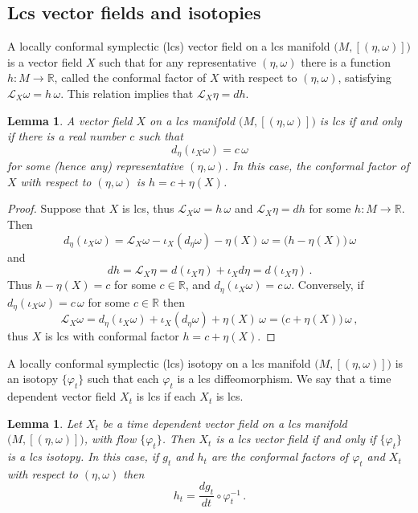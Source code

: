 \documentclass{amsart}
\newtheorem{lemma}[thm]{Lemma}
\theoremstyle{remark}
\begin{document}
\subsection{Lcs vector fields and isotopies}

A locally conformal symplectic (lcs) vector field
on a lcs manifold $\big(M, [(\eta, \omega)]\big)$
is a vector field $X$ such that for any representative $(\eta, \omega)$
there is a function $h: M \rightarrow \mathbb{R}$,
called the conformal factor of $X$ with respect to $(\eta, \omega)$,
satisfying $\mathcal{L}_X \omega = h \, \omega$.
This relation implies that
$\mathcal{L}_X \eta = dh$.

\begin{lemma}\label{lemma: conformal vector field 1}
A vector field $X$ on a lcs manifold $\big(M, [(\eta, \omega)]\big)$
is lcs if and only if there is a real number $c$
such that
$$
d_{\eta} (\iota_X\omega) = c \, \omega
$$
for some (hence any) representative $(\eta, \omega)$.
In this case,
the conformal factor of $X$ with respect to $(\eta, \omega)$
is $h = c + \eta(X)$.
\end{lemma}

\begin{proof}
Suppose that $X$ is lcs,
thus $\mathcal{L}_X \omega = h \, \omega$ and $\mathcal{L}_X \eta = dh$
for some $h: M \rightarrow \mathbb{R}$.
Then
\[
d_{\eta} (\iota_X\omega) = \mathcal{L}_X \omega - \iota_X (d_{\eta}\omega) - \eta(X) \, \omega
= \big( h - \eta(X) \big) \, \omega
\]
and
\[
dh = \mathcal{L}_X \eta = d (\iota_X\eta) + \iota_X d\eta = d (\iota_X\eta) \,.
\]
Thus $h - \eta(X) = c$ for some $c \in \mathbb{R}$,
and $d_{\eta} (\iota_X\omega) = c \, \omega$.
Conversely,
if $d_{\eta} (\iota_X\omega) = c \, \omega$
for some $c \in \mathbb{R}$
then
\[
\mathcal{L}_X \omega = d_{\eta} (\iota_X\omega) + \iota_X (d_{\eta}\omega) + \eta(X) \, \omega
= \big( c + \eta(X) \big) \, \omega \,,
\]
thus $X$ is lcs
with conformal factor $h = c + \eta(X)$.
\end{proof}

A locally conformal symplectic (lcs) isotopy
on a lcs manifold $\big(M, [(\eta, \omega)]\big)$
is an isotopy $\{\varphi_t\}$ such that
each $\varphi_t$ is a lcs diffeomorphism.
We say that a time dependent vector field $X_t$ is lcs
if each $X_t$ is lcs.

\begin{lemma}\label{lemma: conformal vector field}
Let $X_t$ be a time dependent vector field
on a lcs manifold $\big(M, [(\eta, \omega)]\big)$,
with flow $\{\varphi_t\}$.
Then $X_t$ is a lcs vector field
if and only if $\{\varphi_t\}$ is a lcs isotopy.
In this case, if $g_t$ and $h_t$ are the conformal factors of $\varphi_t$ and $X_t$
with respect to $(\eta, \omega)$
then
\[
h_t = \frac{dg_t}{dt} \circ \varphi_t^{-1} \,.
\]
\end{lemma}
\end{document}
